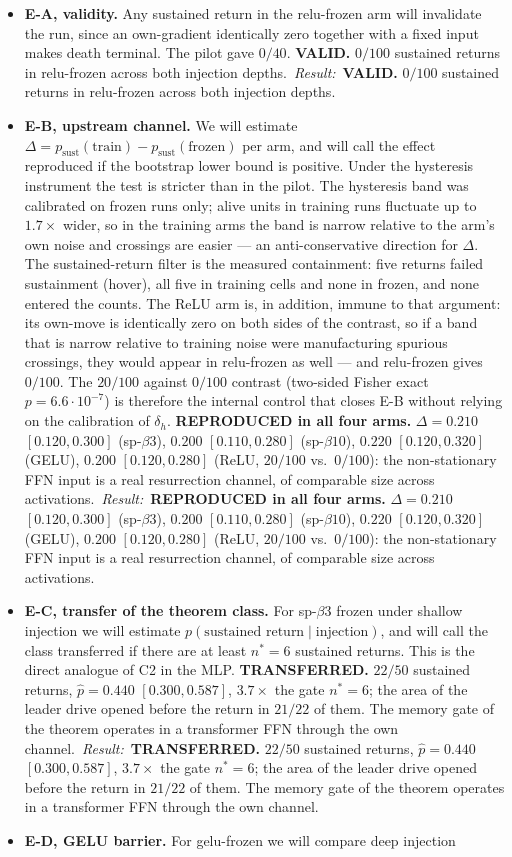\documentclass[11pt]{article}
\makeatletter
\theoremstyle{definition}
\theoremstyle{remark}
\newcommand{\@eresempty}{}
\newcommand{\eresult}[1]{%
  \def\@erestmp{#1}%
  \ifx\@erestmp\@eresempty\else\ \textit{Result:}~#1\fi}
\makeatother
\begin{document}
\begin{itemize}
\item \textbf{E-A, validity.} Any sustained return in the relu-frozen arm will
invalidate the run, since an own-gradient identically zero together with a fixed
input makes death terminal. The pilot gave $0/40$.\eresult{\textbf{VALID.} $0/100$ sustained returns in relu-frozen across both injection depths.}
\item \textbf{E-B, upstream channel.} We will estimate
$\Delta=p_{\mathrm{sust}}(\text{train})-p_{\mathrm{sust}}(\text{frozen})$ per
arm, and will call the effect reproduced if the bootstrap lower bound is
positive. Under the hysteresis instrument the test is stricter than in the
pilot. The hysteresis band was calibrated on frozen runs only; alive units in training runs fluctuate up to $1.7\times$ wider, so in the training arms the band is narrow relative to the arm's own noise and crossings are easier --- an anti-conservative direction for $\Delta$. The sustained-return filter is the measured containment: five returns failed sustainment (hover), all five in training cells and none in frozen, and none entered the counts. The ReLU arm is, in addition, immune to that argument: its own-move is identically zero on both sides of the contrast, so if a band that is narrow relative to training noise were manufacturing spurious crossings, they would appear in relu-frozen as well --- and relu-frozen gives $0/100$. The $20/100$ against $0/100$ contrast (two-sided Fisher exact $p=6.6\cdot10^{-7}$) is therefore the internal control that closes E-B without relying on the calibration of $\delta_h$.\eresult{\textbf{REPRODUCED in all four arms.} $\Delta=0.210$ $[0.120,0.300]$ (sp-$\beta3$), $0.200$ $[0.110,0.280]$ (sp-$\beta10$), $0.220$ $[0.120,0.320]$ (GELU), $0.200$ $[0.120,0.280]$ (ReLU, $20/100$ vs.\ $0/100$): the non-stationary FFN input is a real resurrection channel, of comparable size across activations.}
\item \textbf{E-C, transfer of the theorem class.} For sp-$\beta3$ frozen under
shallow injection we will estimate
$p(\text{sustained return}\mid\text{injection})$, and will call the class
transferred if there are at least $n^\ast=6$ sustained returns. This is the
direct analogue of C2 in the MLP.\eresult{\textbf{TRANSFERRED.} $22/50$ sustained returns, $\hat p=0.440$ $[0.300,0.587]$, $3.7\times$ the gate $n^\ast=6$; the area of the leader drive opened before the return in $21/22$ of them. The memory gate of the theorem operates in a transformer FFN through the own channel.}
\item \textbf{E-D, GELU barrier.} For gelu-frozen we will compare deep injection

\end{itemize}
\end{document}
